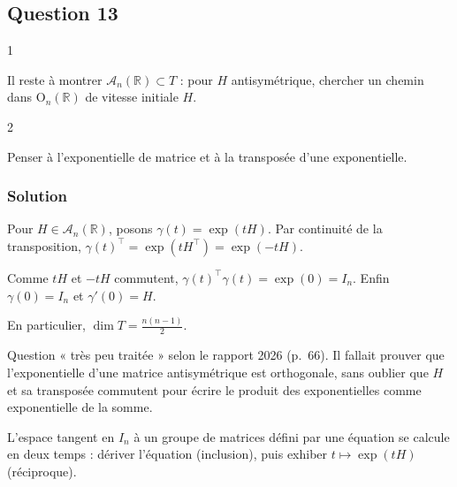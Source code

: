 \documentclass[11pt,a4paper]{article}
\newcommand{\equationajustee}[1]{%
  \sbox{\boiteequation}{$\displaystyle #1$}%
  \ifdim\wd\boiteequation>\linewidth
    \[\resizebox{\linewidth}{!}{\usebox{\boiteequation}}\]%
  \else
    \[#1\]%
  \fi}
\begin{document}
\hypertarget{question-13}{%
\subsection{Question 13}\label{question-13}}

\begin{indication}{1}

Il reste à montrer \(\mathcal A_n(\mathbb R)\subset T\) : pour \(H\) antisymétrique, chercher un chemin dans \({\mathrm{O}}_n(\mathbb R)\) de vitesse initiale \(H\).

\end{indication}

\begin{indication}{2}

Penser à l'exponentielle de matrice et à la transposée d'une exponentielle.

\end{indication}

\hypertarget{solution-12}{%
\subsubsection{Solution}\label{solution-12}}

Pour \(H\in\mathcal A_n(\mathbb R)\), posons \(\gamma(t)=\exp(tH)\). Par continuité de la transposition, \(\gamma(t)^\top=\exp(tH^\top)=\exp(-tH)\).

Comme \(tH\) et \(-tH\) commutent, \(\gamma(t)^\top\gamma(t)=\exp(0)=I_n\). Enfin \(\gamma(0)=I_n\) et \(\gamma'(0)=H\).

\equationajustee{\boxed{T=\mathcal A_n(\mathbb R)}}

En particulier, \(\dim T=\frac{n(n-1)}2\).

\begin{jury}

Question « très peu traitée » selon le rapport 2026 (p.~66). Il fallait prouver que l'exponentielle d'une matrice antisymétrique est orthogonale, sans oublier que \(H\) et sa transposée commutent pour écrire le produit des exponentielles comme exponentielle de la somme.

\end{jury}

\begin{methode}

L'espace tangent en \(I_n\) à un groupe de matrices défini par une équation se calcule en deux temps : dériver l'équation (inclusion), puis exhiber \(t\mapsto\exp(tH)\) (réciproque).

\end{methode}
\end{document}
